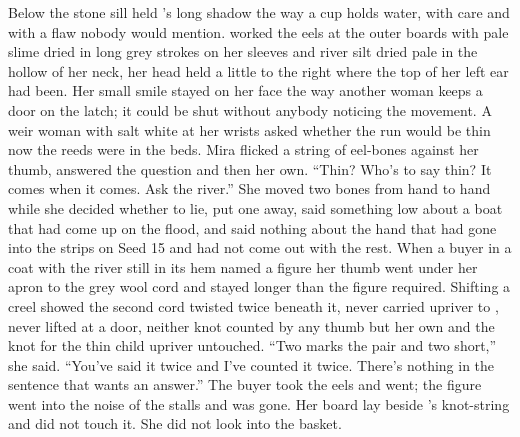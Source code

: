 \scenebreak

Below the stone sill  held 's long shadow the way a cup holds water, with care and with a flaw nobody would mention.  worked the eels at the outer boards with pale slime dried in long grey strokes on her sleeves and river silt dried pale in the hollow of her neck, her head held a little to the right where the top of her left ear had been. Her small smile stayed on her face the way another woman keeps a door on the latch; it could be shut without anybody noticing the movement. A weir woman with salt white at her wrists asked whether the run would be thin now the reeds were in the beds. Mira flicked a string of eel-bones against her thumb, answered the question and then her own. “Thin? Who's to say thin? It comes when it comes. Ask the river.” She moved two bones from hand to hand while she decided whether to lie, put one away, said something low about a boat that had come up on the flood, and said nothing about the hand that had gone into the strips on Seed 15 and had not come out with the rest. When a buyer in a coat with the river still in its hem named a figure her thumb went under her apron to the grey wool cord and stayed longer than the figure required. Shifting a creel showed the second cord twisted twice beneath it, never carried upriver to , never lifted at a door, neither knot counted by any thumb but her own and the knot for the thin child upriver untouched. “Two marks the pair and two short,” she said. “You've said it twice and I've counted it twice. There's nothing in the sentence that wants an answer.” The buyer took the eels and went; the figure went into the noise of the stalls and was gone. Her board lay beside 's knot-string and did not touch it. She did not look into the basket.

